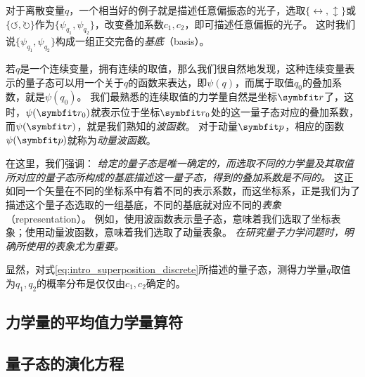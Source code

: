 对于离散变量$q$，一个相当好的例子就是描述任意偏振态的光子，选取$\{\leftrightarrow,\updownarrow\}$或$\{\circlearrowleft,\circlearrowright\}$作为$\{\psi_{q_1},\psi_{q_2}\}$，改变叠加系数$c_1, c_2$，即可描述任意偏振的光子。
这时我们说$\{\psi_{q_1},\psi_{q_2}\}$构成一组正交完备的\emph{基底}（basis）。

若$q$是一个连续变量，拥有连续的取值，那么我们很自然地发现，这种连续变量表示的量子态可以用一个关于$q$的函数来表达，即$\psi(q)$，而属于取值$q_0$的叠加系数，就是$\psi(q_0)$。
我们最熟悉的连续取值的力学量自然是坐标$\rr$了，这时，$\psi(\rr_0)$就表示位于坐标$\rr_0$处的这一量子态对应的叠加系数，而$\psi(\rr)$，就是我们熟知的\emph{波函数}。
对于动量$\pp$，相应的函数$\psi(\pp)$就称为\emph{动量波函数}。

在这里，我们强调：
\emph{给定的量子态是唯一确定的，而选取不同的力学量及其取值所对应的量子态所构成的基底描述这一量子态，得到的叠加系数是不同的。}
这正如同一个矢量在不同的坐标系中有着不同的表示系数，而这坐标系，正是我们为了描述这个量子态选取的一组基底，不同的基底就对应不同的\emph{表象}（representation）。
例如，使用波函数表示量子态，意味着我们选取了坐标表象；使用动量波函数，意味着我们选取了动量表象。
\emph{在研究量子力学问题时，明确所使用的表象尤为重要。}

显然，对式\eqref{eq:intro_superposition_discrete}所描述的量子态，测得力学量$q$取值为$q_1,q_2$的概率分布是仅仅由$c_1, c_2$确定的。



\subsection{\texorpdfstring{力学量的平均值\quad 力学量算符}{力学量的平均值  力学量算符}}



\subsection{\texorpdfstring{量子态的演化\quad \schrodinger 方程}{量子态的演化  \schrodinger 方程}}


